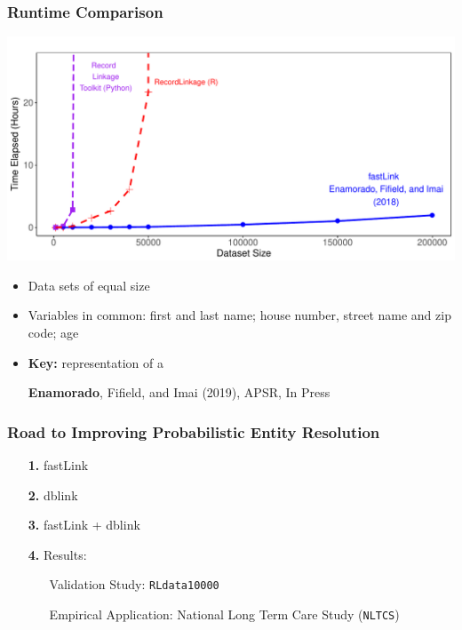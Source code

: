 \documentclass[9pt]{beamer}
\begin{document}
\begin{frame}
\frametitle{Runtime Comparison}

\vspace{-1mm}
  \includegraphics[width=\linewidth,height=\textheight,keepaspectratio]{./figs/runtime_overall.pdf} 
\vspace{-6mm}
    \begin{itemize}
  \item Data sets of equal size
  \item Variables in common: first and last name; house number, street name and zip code; age \pause
  \item \textbf{Key:}  representation of a 
  \item[]
  \item[] \textbf{Enamorado}, Fifield, and Imai (2019), APSR, In Press
  \end{itemize}
\end{frame}

\begin{frame}[plain]
\frametitle{Road to Improving Probabilistic Entity Resolution}

\begin{itemize}
\item[{\color{orange!30} \bf 1.}] {\color{black!30} fastLink}
\vfill
\item[{\color{orange} \bf 2.}] dblink
\vfill
\item[{\color{orange!30} \bf 3.}] {\color{black!30} fastLink + dblink }
\vfill
\item[{\color{orange!30} \bf 4.}] {\color{black!30} Results: }
\vfill
\begin{itemize}
\item[\TedBB] {\color{black!30} Validation Study: \texttt{RLdata10000} } \vfill
\item[\TedBB] {\color{black!30} Empirical Application: National Long Term Care Study (\texttt{NLTCS})}
\end{itemize}
\vfill
\end{itemize}
\end{frame}
\end{document}
